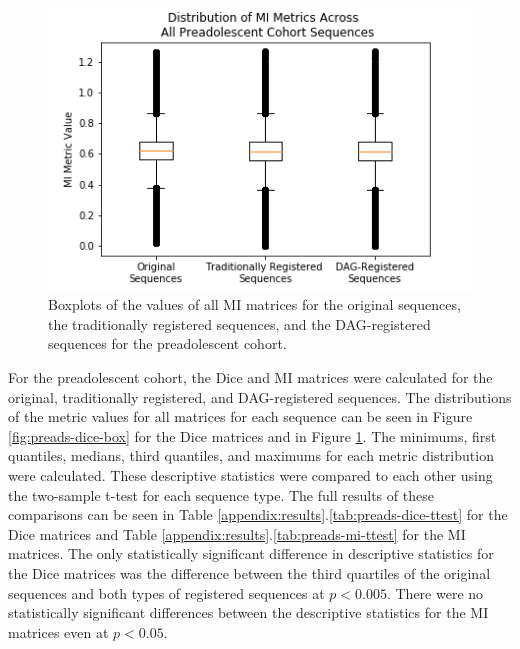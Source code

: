 \begin{figure}[]
\centering
\includegraphics[height=0.3\textheight]{6/figures/preads-mi-box.png}
\caption{Boxplots of the values of all MI matrices for the original sequences, the traditionally registered sequences, and the DAG-registered sequences for the preadolescent cohort.}
\label{fig:preads-mi-box}
\end{figure}

For the preadolescent cohort, the Dice and MI matrices were calculated for the original, traditionally registered, and DAG-registered sequences. The distributions of the metric values for all matrices for each sequence can be seen in Figure \ref{fig:preads-dice-box} for the Dice matrices and in Figure \ref{fig:preads-mi-box}. The minimums, first quantiles, medians, third quantiles, and maximums for each metric distribution were calculated. These descriptive statistics were compared to each other using the two-sample t-test for each sequence type. The full results of these comparisons can be seen in Table \ref{appendix:results}.\ref{tab:preads-dice-ttest} for the Dice matrices and Table \ref{appendix:results}.\ref{tab:preads-mi-ttest} for the MI matrices. The only statistically significant difference in descriptive statistics for the Dice matrices was the difference between the third quartiles of the original sequences and both types of registered sequences at $p < 0.005$. There were no statistically significant differences between the descriptive statistics for the MI matrices even at $p < 0.05$.

